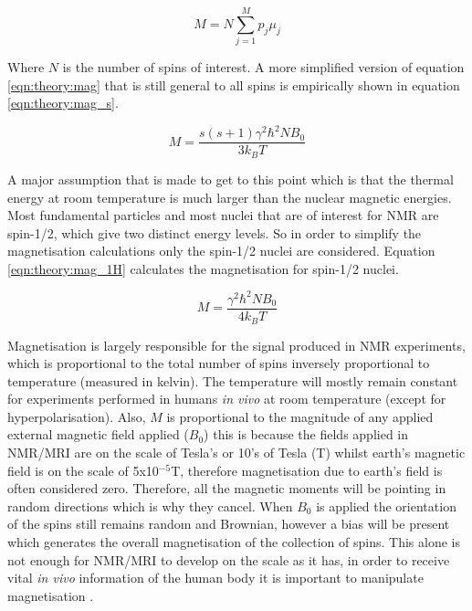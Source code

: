 \begin{equation}
    M = N\sum_{j = 1}^{M}p_j\mu_j
    \label{eqn:theory:mag}
\end{equation}

Where $N$ is the number of spins of interest. A more simplified version of equation \ref{eqn:theory:mag} that is still general to all spins is empirically shown in equation \ref{eqn:theory:mag_s}.

\begin{equation}
    M = \frac{s(s+1)\gamma^2 \hbar^2 N B_0}{3k_BT}
    \label{eqn:theory:mag_s}
\end{equation}

A major assumption that is made to get to this point which is that the thermal energy at room temperature is much larger than the nuclear magnetic energies. Most fundamental particles and most nuclei that are of interest for \ac{NMR} are spin-1/2, which give two distinct energy levels. So in order to simplify the magnetisation calculations only the spin-1/2 nuclei are considered. Equation \ref{eqn:theory:mag_1H} calculates the magnetisation for spin-1/2 nuclei.

\begin{equation}
    M = \frac{\gamma^2 \hbar^2 N B_0}{4k_BT}
    \label{eqn:theory:mag_1H}
\end{equation}

Magnetisation is largely responsible for the signal produced in \ac{NMR} experiments, which is proportional to the total number of spins inversely proportional to temperature (measured in kelvin). The temperature will mostly remain constant for experiments performed in humans \textit{in vivo} at room temperature (except for hyperpolarisation). Also, $M$ is proportional to the magnitude of any applied external magnetic field applied ($B_0$) this is because the fields applied in \ac{NMR}/\ac{MRI} are on the scale of Tesla's or 10's of Tesla (T) whilst earth's magnetic field is on the scale of 5x10$^{-5}$T, therefore magnetisation due to earth's field is often considered zero. Therefore, all the magnetic moments will be pointing in random directions which is why they cancel. When $B_0$ is applied the orientation of the spins still remains random and Brownian, however a bias will be present which generates the overall magnetisation of the collection of spins. This alone is not enough for \ac{NMR}/\ac{MRI} to develop on the scale as it has, in order to receive vital \textit{in vivo} information of the human body it is important to manipulate magnetisation \cite{Haacke2014MagneticDesign}. 

